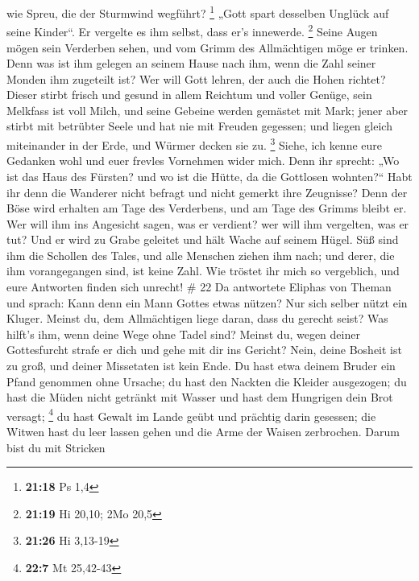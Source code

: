 wie Spreu, die der Sturmwind wegführt? \footnote{\textbf{21:18} Ps 1,4}
 „Gott spart desselben Unglück auf seine Kinder``. Er
vergelte es ihm selbst, dass er's innewerde. \footnote{\textbf{21:19} Hi
  20,10; 2Mo 20,5}  Seine Augen mögen sein Verderben
sehen, und vom Grimm des Allmächtigen möge er trinken. 
Denn was ist ihm gelegen an seinem Hause nach ihm, wenn die Zahl seiner
Monden ihm zugeteilt ist?  Wer will Gott lehren, der auch
die Hohen richtet?  Dieser stirbt frisch und gesund in
allem Reichtum und voller Genüge,  sein Melkfass ist voll
Milch, und seine Gebeine werden gemästet mit Mark;  jener
aber stirbt mit betrübter Seele und hat nie mit Freuden gegessen;
 und liegen gleich miteinander in der Erde, und Würmer
decken sie zu. \footnote{\textbf{21:26} Hi 3,13-19} 
Siehe, ich kenne eure Gedanken wohl und euer frevles Vornehmen wider
mich.  Denn ihr sprecht: „Wo ist das Haus des Fürsten?
und wo ist die Hütte, da die Gottlosen wohnten?{}``  Habt
ihr denn die Wanderer nicht befragt und nicht gemerkt ihre Zeugnisse?
 Denn der Böse wird erhalten am Tage des Verderbens, und
am Tage des Grimms bleibt er.  Wer will ihm ins Angesicht
sagen, was er verdient? wer will ihm vergelten, was er tut?
 Und er wird zu Grabe geleitet und hält Wache auf seinem
Hügel.  Süß sind ihm die Schollen des Tales, und alle
Menschen ziehen ihm nach; und derer, die ihm vorangegangen sind, ist
keine Zahl.  Wie tröstet ihr mich so vergeblich, und eure
Antworten finden sich unrecht! \# 22  Da antwortete
Eliphas von Theman und sprach:  Kann denn ein Mann Gottes
etwas nützen? Nur sich selber nützt ein Kluger.  Meinst
du, dem Allmächtigen liege daran, dass du gerecht seist? Was hilft's
ihm, wenn deine Wege ohne Tadel sind?  Meinst du, wegen
deiner Gottesfurcht strafe er dich und gehe mit dir ins Gericht?
 Nein, deine Bosheit ist zu groß, und deiner Missetaten
ist kein Ende.  Du hast etwa deinem Bruder ein Pfand
genommen ohne Ursache; du hast den Nackten die Kleider ausgezogen;
 du hast die Müden nicht getränkt mit Wasser und hast dem
Hungrigen dein Brot versagt; \footnote{\textbf{22:7} Mt 25,42-43}
 du hast Gewalt im Lande geübt und prächtig darin
gesessen;  die Witwen hast du leer lassen gehen und die
Arme der Waisen zerbrochen.  Darum bist du mit Stricken

